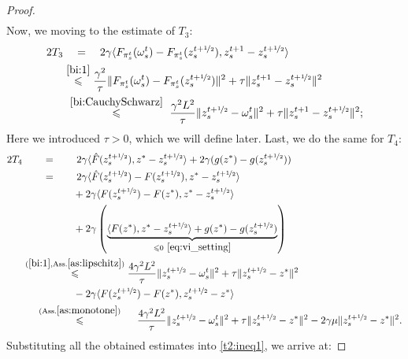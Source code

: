 \documentclass{article}
\begin{document}
\begin{proof}
\begin{align*}
        \end{align*}
        Now, we moving to the estimate of $T_3$:
        \begin{align*}
            2T_3 & ~~~= ~~~2\gamma\langle F_{\pi_s^t}(\omega_s^t) - F_{\pi_s^t}(z_s^{t+\nicefrac{1}{2}}), z_s^{t+1} - z_s^{t+\nicefrac{1}{2}}\rangle \\
            &\overset{\eqref{bi:1}}{\leqslant} \frac{\gamma^2}{\tau}\|F_{\pi_s^t}(\omega_s^t) - F_{\pi_s^t}(z_s^{t+\nicefrac{1}{2}})\|^2 + \tau \|z_s^{t+1} - z_s^{t+\nicefrac{1}{2}}\|^2 \\
            &~\overset{\eqref{bi:CauchySchwarz}}{\leqslant} ~\frac{\gamma^2 L^2}{\tau}\|z_s^{t+\nicefrac{1}{2}} - \omega_s^t\|^2 + \tau \|z_s^{t+1} - z_s^{t+\nicefrac{1}{2}}\|^2;
        \end{align*}
        Here we introduced $\tau > 0$, which we will define later. Last, we do the same for $T_4$:
        \begin{align*}
            2T_4 &\quad \quad=\quad \quad  2\gamma\langle \hat{F} (z_s^{t+\nicefrac{1}{2}}), z^* - z_s^{t+\nicefrac{1}{2}}\rangle + 2\gamma (g(z^*) - g(z_s^{t+\nicefrac{1}{2}}))\\
            &\quad \quad =\quad \quad  2\gamma\langle \hat{F} (z_s^{t+\nicefrac{1}{2}}) - F(z_s^{t+\nicefrac{1}{2}}), z^* - z_s^{t+\nicefrac{1}{2}}\rangle \\
            &\quad\quad \quad\quad\quad + 2\gamma\langle F (z_s^{t+\nicefrac{1}{2}}) - F(z^*), z^* - z_s^{t+\nicefrac{1}{2}}\rangle \\
            &\quad \quad \quad \quad \quad + 2\gamma\left(\underbrace{\langle F(z^*), z^* - z_s^{t+\nicefrac{1}{2}}\rangle + g(z^*) - g(z_s^{t+\nicefrac{1}{2}})}_{\leqslant 0 ~\eqref{eq:vi_setting}}\right) \\
            &\overset{(\ref{bi:1}, \text{Ass.} \ref{as:lipschitz})}{\leqslant} \frac{4\gamma^2 L^2}{\tau} \|z_s^{t+\nicefrac{1}{2}} - \omega_s^t\|^2 + \tau \|z_s^{t+\nicefrac{1}{2}} - z^*\|^2 \\
            &\quad \quad \quad \quad \quad  - 2\gamma\langle F (z_s^{t+\nicefrac{1}{2}}) - F(z^*), z_s^{t+\nicefrac{1}{2}} - z^*\rangle\\
            &\quad ~ \overset{(\text{Ass.} \ref{as:monotone})}{\leqslant} \quad ~ \frac{4\gamma^2 L^2}{\tau} \|z_s^{t+\nicefrac{1}{2}} - \omega_s^t\|^2 + \tau \|z_s^{t+\nicefrac{1}{2}} - z^*\|^2 - 2\gamma\mu\|z_s^{t+\nicefrac{1}{2}} - z^*\|^2. 
        \end{align*}
       Substituting all the obtained estimates into \eqref{t2:ineq1}, we arrive at:

\end{proof}
\end{document}
